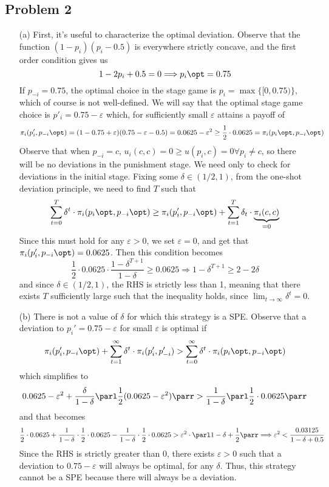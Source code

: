\documentclass[10pt]{article}
\begin{document}
\subsection*{Problem 2}

\begin{itemize}
	\item[(a)] First, it's useful to characterize the optimal deviation. Observe that the function $(1-p_i)(p_i-0.5)$ is everywhere strictly concave, and the first order condition gives us \[1 - 2p_i + 0.5 = 0 \Longrightarrow p_i\opt = 0.75\]If $p_{-i} = 0.75$, the optimal choice in the stage game is $p_i = \max\{[0,0.75)\}$, which of course is not well-defined. We will say that the optimal stage game choice is $p'_i = 0.75 - \varepsilon$ which, for sufficiently small $\varepsilon$ attains a payoff of \[\pi_i(p_i',p_{-i}\opt) = (1-0.75 + \varepsilon)(0.75 - \varepsilon - 0.5) = 0.0625 - \varepsilon^2 \ge \frac{1}{2} \cdot 0.0625 = \pi_i(p_i\opt,p_{-i}\opt)	\]Observe that when $p_{-i} = c$, $u_i(c,c) = 0 \ge u(p_i,c) = 0 \forall p_i \ne c$, so there will be no deviations in the punishment stage. We need only to check for deviations in the initial stage. Fixing some $\delta \in (1/2,1)$, from the one-shot deviation principle, we need to find $T$ such that \[\sum_{t=0}^T \delta^t \cdot \pi_i(p_i\opt,p_{-i}\opt) \ge \pi_i(p_i',p_{-i}\opt) + \sum_{t=1}^T \delta_t \cdot \underbrace{\pi_i(c,c)}_{=0}\]Since this must hold for any $\varepsilon > 0$, we set $\varepsilon = 0$, and get that $\pi_i(p_i',p_{-i}\opt) = 0.0625$. Then this condition becomes \[\frac{1}{2} \cdot 0.0625 \cdot \frac{1-\delta^{T+1}}{1-\delta} \ge 0.0625 \Longrightarrow 1-\delta^{T+1} \ge 2 - 2\delta \]and since $\delta \in (1/2,1)$, the RHS is strictly less than 1, meaning that there exists $T$ sufficiently large such that the inequality holds, since $\lim_{t\to\infty} \delta^t = 0$.
	\item[(b)] There is not a value of $\delta$ for which this strategy is a SPE. Observe that a deviation to $p_i' = 0.75 - \varepsilon$ for small $\varepsilon$ is optimal if\[\pi_i(p_i',p_{-i}\opt) + \sum_{t=1}^\infty \delta^t \cdot \pi_i(p_i',p_{-i}')  > \sum_{t=0}^\infty \delta^t \cdot \pi_i(p_i\opt,p_{-i}\opt)\]which simplifies to\[0.0625 - \varepsilon^2 + \frac{\delta}{1-\delta}\parl \frac{1}{2} (0.0625 - \varepsilon^2)\parr > \frac{1}{1-\delta} \parl \frac{1}{2} \cdot 0.0625\parr\]and that becomes\[\frac{1}{2} \cdot 0.0625 + \frac{1}{1-\delta}\cdot  \frac{1}{2}\cdot 0.0625 -  \frac{1}{1-\delta}\cdot  \frac{1}{2}\cdot 0.0625> \varepsilon^2 \cdot \parl 1 - \delta + \frac{1}{2}\parr \Longrightarrow \varepsilon^2 < \frac{0.03125}{1-\delta + 0.5}\]Since the RHS is strictly greater than 0, there exists $\varepsilon > 0$ such that a deviation to $0.75 - \varepsilon$ will always be optimal, for any $\delta$. Thus, this strategy cannot be a SPE because there will always be a deviation.
\end{itemize}
\end{document}

